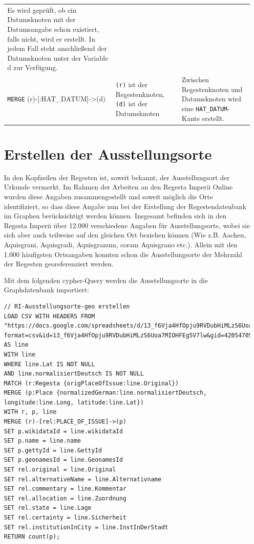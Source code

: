 \documentclass[ngerman,]{scrreprt}
\begin{document}
\begin{longtable}[]{@{}lll@{}}
\begin{minipage}[t]{0.11\columnwidth}
Es wird geprüft, ob ein Datumsknoten mit der Datumsangabe schon existiert, falls nicht, wird er erstellt. In jedem Fall steht anschließend der Datumsknoten unter der Variable d zur Verfügung.\strut
\end{minipage}\tabularnewline
\begin{minipage}[t]{0.13\columnwidth}\raggedright\strut
\texttt{MERGE} (r)-{[}:HAT\_DATUM{]}-\textgreater{}(d)\strut
\end{minipage} & \begin{minipage}[t]{0.09\columnwidth}\raggedright\strut
\texttt{(r)} ist der Regestenknoten, \texttt{(d)} ist der Datumsknoten\strut
\end{minipage} & \begin{minipage}[t]{0.11\columnwidth}\raggedright\strut
Zwischen Regestenknoten und Datumsknoten wird eine \texttt{HAT\_DATUM}-Kante erstellt.\strut
\end{minipage}\tabularnewline
\bottomrule
\end{longtable}

\section{Erstellen der Ausstellungsorte}\label{erstellen-der-ausstellungsorte}

In den Kopfzeilen der Regesten ist, soweit bekannt, der Ausstellungsort der Urkunde vermerkt. Im Rahmen der Arbeiten an den Regesta Imperii Online wurden diese Angaben zusammengestellt und soweit möglich die Orte identifiziert, so dass diese Angabe nun bei der Erstellung der Regestendatenbank im Graphen berücksichtigt werden können. Insgesamt befinden sich in den Regesta Imperii über 12.000 verschiedene Angaben für Ausstellungsorte, wobei sie sich aber auch teilweise auf den gleichen Ort beziehen können (Wie z.B. Aachen, Aquisgrani, Aquisgradi, Aquisgranum, coram Aquisgrano etc.). Allein mit den 1.000 häufigsten Ortsangaben konnten schon die Ausstellungsorte der Mehrzahl der Regesten georeferenziert werden.

Mit dem folgenden cypher-Query werden die Ausstellungsorte in die Graphdatenbank importiert:

\begin{verbatim}
// RI-Ausstellungsorte-geo erstellen
LOAD CSV WITH HEADERS FROM "https://docs.google.com/spreadsheets/d/13_f6Vja4HfOpju9RVDubHiMLzS6Uoa7MIOHFEg5V7lw/export?format=csv&id=13_f6Vja4HfOpju9RVDubHiMLzS6Uoa7MIOHFEg5V7lw&gid=420547059" AS line
WITH line
WHERE line.Lat IS NOT NULL
AND line.normalisiertDeutsch IS NOT NULL
MATCH (r:Regesta {origPlaceOfIssue:line.Original})
MERGE (p:Place {normalizedGerman:line.normalisiertDeutsch, longitude:line.Long, latitude:line.Lat})
WITH r, p, line
MERGE (r)-[rel:PLACE_OF_ISSUE]->(p)
SET p.wikidataId = line.wikidataId
SET p.name = line.name
SET p.gettyId = line.GettyId
SET p.geonamesId = line.GeonamesId
SET rel.original = line.Original
SET rel.alternativeName = line.Alternativname
SET rel.commentary = line.Kommentar
SET rel.allocation = line.Zuordnung
SET rel.state = line.Lage
SET rel.certainty = line.Sicherheit
SET rel.institutionInCity = line.InstInDerStadt
RETURN count(p);
\end{verbatim}
\end{document}
